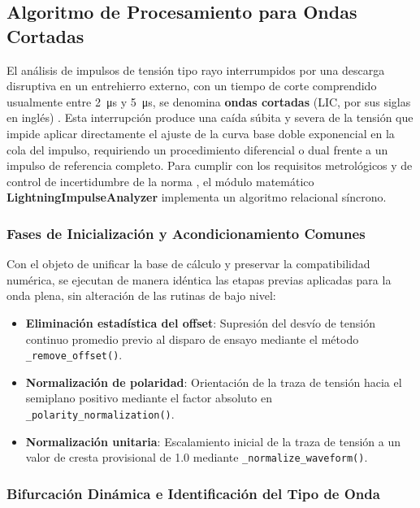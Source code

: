 \subsection{Algoritmo de Procesamiento para Ondas Cortadas}
\label{subsec:algoritmo_ondas_cortadas}

El análisis de impulsos de tensión tipo rayo interrumpidos por una descarga disruptiva en un entrehierro externo, con un tiempo de corte comprendido usualmente entre \qty{2}{\micro\second} y \qty{5}{\micro\second}, se denomina \textbf{ondas cortadas} (LIC, por sus siglas en inglés) \cite{iec60060_1}. Esta interrupción produce una caída súbita y severa de la tensión que impide aplicar directamente el ajuste de la curva base doble exponencial en la cola del impulso, requiriendo un procedimiento diferencial o dual frente a un impulso de referencia completo. Para cumplir con los requisitos metrológicos y de control de incertidumbre de la norma \cite{iec61083_2}, el módulo matemático \textbf{LightningImpulseAnalyzer} implementa un algoritmo relacional síncrono.

\subsubsection{Fases de Inicialización y Acondicionamiento Comunes}
\label{subsubsection:fases_comunes_lic}

Con el objeto de unificar la base de cálculo y preservar la compatibilidad numérica, se ejecutan de manera idéntica las etapas previas aplicadas para la onda plena, sin alteración de las rutinas de bajo nivel:

\begin{itemize}
    \item \textbf{Eliminación estadística del offset}: Supresión del desvío de tensión continuo promedio previo al disparo de ensayo mediante el método \texttt{\_remove\_offset()}.
    \item \textbf{Normalización de polaridad}: Orientación de la traza de tensión hacia el semiplano positivo mediante el factor absoluto en \texttt{\_polarity\_normalization()}.
    \item \textbf{Normalización unitaria}: Escalamiento inicial de la traza de tensión a un valor de cresta provisional de \qty{1.0}{} mediante \texttt{\_normalize\_waveform()}.
\end{itemize}

\subsubsection{Bifurcación Dinámica e Identificación del Tipo de Onda}
\label{subsubsection:bifurcacion_dinamica}

